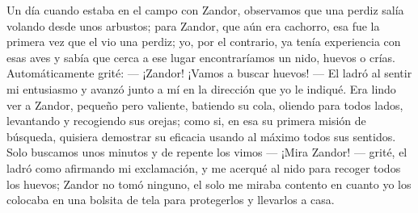 Un día cuando estaba en el campo con Zandor, observamos que una perdiz salía volando desde unos arbustos; para Zandor, que aún era cachorro, esa fue la primera vez que el vio una perdiz; yo, por el contrario, ya tenía experiencia con esas aves y sabía que cerca a ese lugar encontraríamos un nido, huevos o crías.
Automáticamente grité: 
--- ¡Zandor! ¡Vamos a buscar huevos! --- 
El ladró al sentir mi entusiasmo y avanzó junto a mí en la dirección que yo le indiqué.
Era lindo ver a Zandor, pequeño pero valiente, batiendo su cola, oliendo para todos lados, levantando y recogiendo sus orejas; como si, en esa su primera misión de búsqueda, quisiera demostrar su eficacia usando al máximo todos sus sentidos.
Solo buscamos unos minutos y de repente los vimos --- ¡Mira Zandor! --- grité, el ladró como afirmando mi exclamación, y me acerqué al nido para recoger todos los huevos; Zandor no tomó ninguno, el solo me miraba contento en cuanto yo los colocaba en una bolsita de tela para protegerlos y llevarlos a casa.

